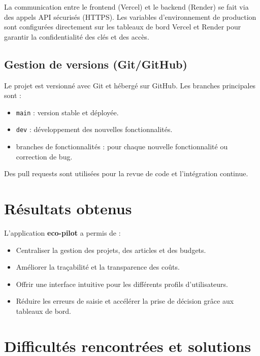 \documentclass[12pt,a4paper]{report}
\begin{document}
La communication entre le frontend (Vercel) et le backend (Render) se fait via des appels API sécurisés (HTTPS). Les variables d’environnement de production sont configurées directement sur les tableaux de bord Vercel et Render pour garantir la confidentialité des clés et des accès.

\section{Gestion de versions (Git/GitHub)}

Le projet est versionné avec Git et hébergé sur GitHub. Les branches principales sont :
\begin{itemize}
    \item \texttt{main} : version stable et déployée.
    \item \texttt{dev} : développement des nouvelles fonctionnalités.
    \item branches de fonctionnalités : pour chaque nouvelle fonctionnalité ou correction de bug.
\end{itemize}
Des pull requests sont utilisées pour la revue de code et l’intégration continue.

\chapter{Résultats obtenus}

L’application \textbf{eco-pilot} a permis de :
\begin{itemize}
    \item Centraliser la gestion des projets, des articles et des budgets.
    \item Améliorer la traçabilité et la transparence des coûts.
    \item Offrir une interface intuitive pour les différents profils d’utilisateurs.
    \item Réduire les erreurs de saisie et accélérer la prise de décision grâce aux tableaux de bord.
\end{itemize}




\chapter{Difficultés rencontrées et solutions}
\end{document}
